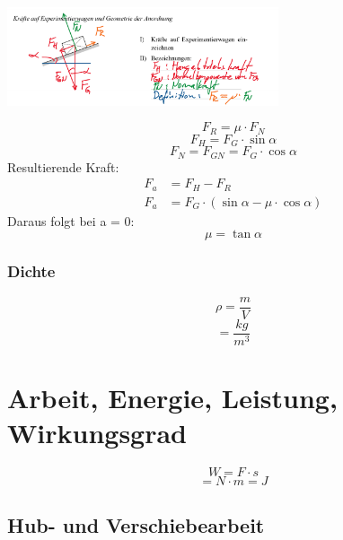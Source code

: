 \documentclass[a4paper]{IEEEtran}
\begin{document}
  \begin{center}
    \includegraphics[width=8cm]{images/dynamik_schiefe_bahn.png}
  \end{center}
  \begin{equation}
    F_R = \mu \cdot F_N
  \end{equation}
  \begin{equation}
    F_H = F_G \cdot \sin{\alpha}
  \end{equation}
  \begin{equation}
    F_N = F_{GN} = F_{G} \cdot \cos{\alpha}
  \end{equation}
  Resultierende Kraft:
  \begin{align}
    F_a &= F_H - F_R \\
    F_a &= F_G \cdot (\sin{\alpha} - \mu \cdot \cos{\alpha})
  \end{align}
  Daraus folgt bei a = 0:
  \begin{equation}
    \mu = \tan{\alpha}
  \end{equation}


  \subsubsection{Dichte}
  \begin{equation}
    \rho = \frac{m}{V}
  \end{equation}
  \begin{equation}
    [\rho] = \frac{kg}{m^3}
  \end{equation}

  \section{Arbeit, Energie, Leistung, Wirkungsgrad}
  \begin{equation}
    W = F \cdot s
  \end{equation}
  \begin{equation}
    [W] = N \cdot m = J
  \end{equation}

  \subsection{Hub- und Verschiebearbeit}
\end{document}
